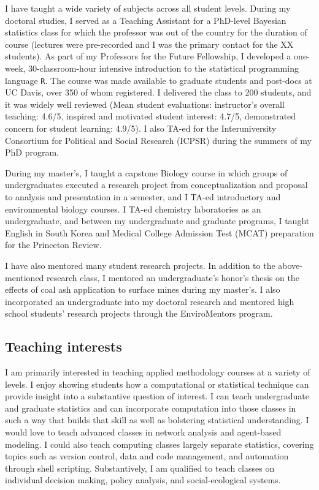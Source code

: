 I have taught a wide variety of subjects across all student levels.
During my doctoral studies, I served as a Teaching Assistant for a
PhD-level Bayesian statistics class for which the professor was out of
the country for the duration of course (lectures were pre-recorded and I
was the primary contact for the XX students). As part of my Professors
for the Future Fellowship, I developed a one-week, 30-classroom-hour
intensive introduction to the statistical programming language
\texttt{R}. The course was made available to graduate students and
post-docs at UC Davis, over 350 of whom registered. I delivered the
class to 200 students, and it was widely well reviewed (Mean student
evaluations: instructor's overall teaching: 4.6/5, inspired and
motivated student interest: 4.7/5, demonstrated concern for student
learning: 4.9/5). I also TA-ed for the Interuniversity Consortium for
Political and Social Research (ICPSR) during the summers of my PhD
program. \medskip

During my master's, I taught a capstone Biology course in which groups
of undergraduates executed a research project from conceptualization and
proposal to analysis and presentation in a semester, and I TA-ed
introductory and environmental biology courses. I TA-ed chemistry
laboratories as an undergraduate, and between my undergraduate and
graduate programs, I taught English in South Korea and Medical College
Admission Test (MCAT) preparation for the Princeton Review.

I have also mentored many student research projects. In addition to the
above-mentioned research class, I mentored an undergraduate's honor's
thesis on the effects of coal ash application to surface mines during my
master's. I also incorporated an undergraduate into my doctoral research
and mentored high school students' research projects through the
EnviroMentors program.

\subsection{Teaching interests}\label{teaching-interests}

I am primarily interested in teaching applied methodology courses at a
variety of levels. I enjoy showing students how a computational or
statistical technique can provide insight into a substantive question of
interest. I can teach undergraduate and graduate statistics and can
incorporate computation into those classes in such a way that builds
that skill as well as bolstering statistical understanding. I would love
to teach advanced classes in network analysis and agent-based modeling.
I could also teach computing classes largely separate statistics,
covering topics such as version control, data and code management, and
automation through shell scripting. Substantively, I am qualified to
teach classes on individual decision making, policy analysis, and
social-ecological systems.
